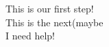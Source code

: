\documentclass[UTF8]{ctexart}
\begin{document}
    This is our first step! \\
    This is the next(maybe  \\
    I need help!
\end{document}
